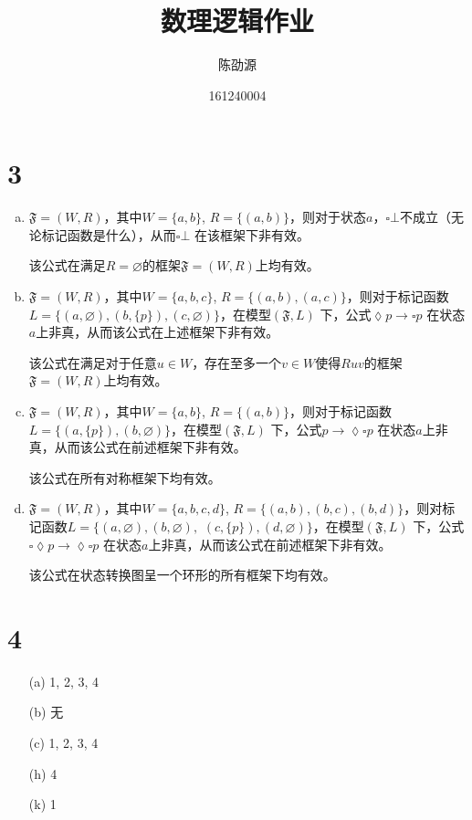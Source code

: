\documentclass{article}
\begin{document}
\title{数理逻辑作业}
\author{陈劭源 \and 161240004}
\maketitle

\section*{3}
\begin{enumerate}[(a)]
  \item $\mathfrak{F} = (W, R)$，其中$W = \{a, b\}$, $R = \{(a, b)\}$，则对于状态$a$，$\square \bot$不成立（无论标记函数是什么），从而$\square \bot$ 在该框架下非有效。

  该公式在满足$R = \varnothing$的框架$\mathfrak{F} = (W, R)$上均有效。

  \item $\mathfrak{F} = (W, R)$，其中$W = \{a, b, c\}$, $R = \{(a, b), (a, c)\}$，则对于标记函数$L = \{(a, \varnothing), (b, \{p\}), (c, \varnothing)\}$，在模型$(\mathfrak{F}, L)$ 下，公式$\lozenge p \rightarrow \square p$ 在状态$a$上非真，从而该公式在上述框架下非有效。

  该公式在满足对于任意$u \in W$，存在至多一个$v \in W$使得$Ruv$的框架$\mathfrak{F} = (W, R)$上均有效。
  \item $\mathfrak{F} = (W, R)$，其中$W = \{a, b\}$, $R = \{(a, b)\}$，则对于标记函数$L = \{(a, \{p\}), (b,\varnothing)\}$，在模型$(\mathfrak{F}, L)$ 下，公式$p \rightarrow \lozenge \square p$ 在状态$a$上非真，从而该公式在前述框架下非有效。

  该公式在所有对称框架下均有效。
  \item $\mathfrak{F} = (W, R)$，其中$W = \{a, b, c, d\}$, $R = \{(a, b), (b, c), (b, d)\}$，则对标记函数$L = \{(a, \varnothing), (b,\varnothing), $  $(c, \{p\}), (d,\varnothing) \}$，在模型$(\mathfrak{F}, L)$ 下，公式$\square \lozenge p \rightarrow \lozenge \square p$ 在状态$a$上非真，从而该公式在前述框架下非有效。

  该公式在状态转换图呈一个环形的所有框架下均有效。
\end{enumerate}

\section*{4}
\begin{enumerate}[(a)]
  \item[(a)] 1, 2, 3, 4
  \item[(b)] 无
  \item[(c)] 1, 2, 3, 4
  \item[(h)] 4
  \item[(k)] 1
\end{enumerate}
\end{document}
